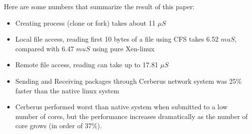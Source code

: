 \documentclass[journal]{IEEEtran}
\begin{document}
\begin{itemize}
	Here are some numbers that summarize the result of this paper:
	\begin{itemize}
	\item Creating process (clone or fork) takes about 11 $\mu S$ %
	\item Local file access, reading first 10 bytes of a file using CFS takes 6.52 $mu S$, compared with 6.47 $mu S$ using pure Xen-linux
	\item Remote file access, reading can take up to 17.81 $\mu S$
	\item Sending and Receiving packages through Cerberus network system was 25\% faster than the native linux system
	\item Cerberus performed worst than native system when submitted to a low number of cores, but the performance increases dramatically as the number of core grows (in order of 37\%).
	\end{itemize}

\end{itemize}


\end{document}
